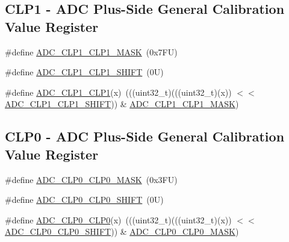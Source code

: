 \subsection*{C\+L\+P1 -\/ A\+DC Plus-\/\+Side General Calibration Value Register}
\begin{DoxyCompactItemize}
\item 
\#define \mbox{\hyperlink{group___a_d_c___register___masks_ga597fddbb6d859ea54a49dd4a1eea72fb}{A\+D\+C\+\_\+\+C\+L\+P1\+\_\+\+C\+L\+P1\+\_\+\+M\+A\+SK}}~(0x7\+F\+U)
\item 
\#define \mbox{\hyperlink{group___a_d_c___register___masks_gab34e145666bb569d17f381665d6f5156}{A\+D\+C\+\_\+\+C\+L\+P1\+\_\+\+C\+L\+P1\+\_\+\+S\+H\+I\+FT}}~(0\+U)
\item 
\#define \mbox{\hyperlink{group___a_d_c___register___masks_gaf48a7a2edeb5d0485c5cdfdf19bd3e18}{A\+D\+C\+\_\+\+C\+L\+P1\+\_\+\+C\+L\+P1}}(x)~(((uint32\+\_\+t)(((uint32\+\_\+t)(x)) $<$$<$ \mbox{\hyperlink{group___a_d_c___register___masks_gab34e145666bb569d17f381665d6f5156}{A\+D\+C\+\_\+\+C\+L\+P1\+\_\+\+C\+L\+P1\+\_\+\+S\+H\+I\+FT}})) \& \mbox{\hyperlink{group___a_d_c___register___masks_ga597fddbb6d859ea54a49dd4a1eea72fb}{A\+D\+C\+\_\+\+C\+L\+P1\+\_\+\+C\+L\+P1\+\_\+\+M\+A\+SK}})
\end{DoxyCompactItemize}
\subsection*{C\+L\+P0 -\/ A\+DC Plus-\/\+Side General Calibration Value Register}
\begin{DoxyCompactItemize}
\item 
\#define \mbox{\hyperlink{group___a_d_c___register___masks_ga7a8099e7e4fcb450308767ab0df8e458}{A\+D\+C\+\_\+\+C\+L\+P0\+\_\+\+C\+L\+P0\+\_\+\+M\+A\+SK}}~(0x3\+F\+U)
\item 
\#define \mbox{\hyperlink{group___a_d_c___register___masks_gad3035c445e10948c653ac0a028008109}{A\+D\+C\+\_\+\+C\+L\+P0\+\_\+\+C\+L\+P0\+\_\+\+S\+H\+I\+FT}}~(0\+U)
\item 
\#define \mbox{\hyperlink{group___a_d_c___register___masks_ga8ec1b8f6f0baa869f77385865e51a20d}{A\+D\+C\+\_\+\+C\+L\+P0\+\_\+\+C\+L\+P0}}(x)~(((uint32\+\_\+t)(((uint32\+\_\+t)(x)) $<$$<$ \mbox{\hyperlink{group___a_d_c___register___masks_gad3035c445e10948c653ac0a028008109}{A\+D\+C\+\_\+\+C\+L\+P0\+\_\+\+C\+L\+P0\+\_\+\+S\+H\+I\+FT}})) \& \mbox{\hyperlink{group___a_d_c___register___masks_ga7a8099e7e4fcb450308767ab0df8e458}{A\+D\+C\+\_\+\+C\+L\+P0\+\_\+\+C\+L\+P0\+\_\+\+M\+A\+SK}})
\end{DoxyCompactItemize}
